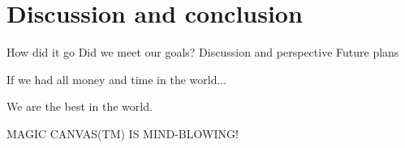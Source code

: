 \chapter{Discussion and conclusion}
How did it go
Did we meet our goals?
Discussion and perspective
Future plans

If we had all money and time in the world...

We are the best in the world.

MAGIC CANVAS(TM) IS MIND-BLOWING!